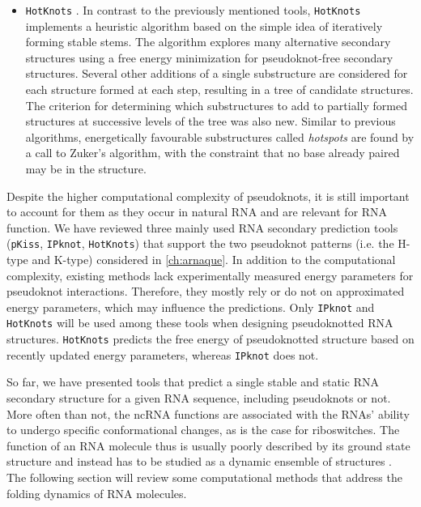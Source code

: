 \begin{itemize}
	\item \texttt{HotKnots} \cite{ren2005hotknots}. In contrast to the previously mentioned tools, \texttt{HotKnots} implements a heuristic algorithm based on the simple idea of iteratively forming stable stems. The algorithm explores many alternative secondary structures using a free energy minimization for pseudoknot-free secondary structures. Several other additions of a single substructure are considered for each structure formed at each step, resulting in a tree of candidate structures. The criterion for determining which substructures to add to partially formed structures at successive levels of the tree was also new. Similar to previous algorithms, energetically favourable substructures called \textit{hotspots} are found by a call to Zuker’s algorithm, with the constraint that no base already paired may be in the structure. 
\end{itemize}

Despite the higher computational complexity of pseudoknots, it is still important to account for them as they occur in natural \ac{RNA} and are relevant for \ac{RNA} function. We have reviewed three mainly used \ac{RNA} secondary prediction tools (\texttt{pKiss}, \texttt{IPknot}, \texttt{HotKnots}) that support the two pseudoknot patterns (i.e. the H-type and K-type) considered in \autoref{ch:arnaque}. In addition to the computational complexity, existing methods lack experimentally measured energy parameters for pseudoknot interactions. Therefore, they mostly rely or do not on approximated energy parameters, which may influence the predictions. Only \texttt{IPknot} and \texttt{HotKnots} will be used among these tools when designing pseudoknotted \ac{RNA} structures. \texttt{HotKnots} predicts the free energy of pseudoknotted structure based on recently updated energy parameters, whereas \texttt{IPknot} does not.  

So far, we have presented tools that predict a single stable and static \ac{RNA} secondary structure for a given \ac{RNA} sequence, including pseudoknots or not. More often than not, the \ac{ncRNA} functions are associated with the \acp{RNA}’ ability to undergo specific conformational changes, as is the case for riboswitches. The function of an \ac{RNA} molecule thus is usually poorly described by its ground state structure and instead has to be studied as a dynamic ensemble of structures \cite{onoa2004rna, dirks2004paradigms}. The following section will review some computational methods that address the folding dynamics of \ac{RNA} molecules.

